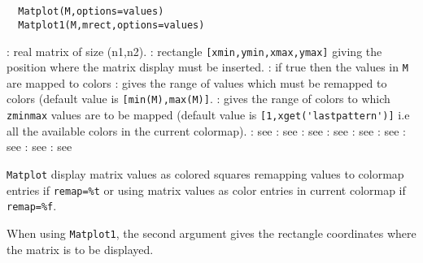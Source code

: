 
\begin{mandesc}
  \\
  \\
\end{mandesc}
\begin{calling_sequence}
\begin{verbatim}
  Matplot(M,options=values)
  Matplot1(M,mrect,options=values)
\end{verbatim}
\end{calling_sequence}

\begin{parameters}
  \begin{varlist}
    : real matrix of size (n1,n2).
    : rectangle \verb![xmin,ymin,xmax,ymax]! giving the position where the matrix display must be inserted.
    : if true then the values in \verb!M! are mapped to colors
    : gives the range of values which must be remapped to colors (default value is
    \verb![min(M),max(M)]!.
    : gives the range of colors to which \verb!zminmax! values are to be mapped
    (default value is \verb![1,xget('lastpattern')]! i.e all the available colors in the current
    colormap).
    : see 
    : see 
    :  see 
    :  see 
    :  see 
    : see 
    :  see 
    :  see 
    :  see 
  \end{varlist}
\end{parameters}

\begin{mandescription}
  \verb!Matplot! display matrix values as colored squares remapping values to colormap entries
  if \verb!remap=%t! or using matrix values as color entries in current colormap
  if \verb!remap=%f!.

  When using \verb!Matplot1!, the second argument gives the rectangle coordinates
  where the matrix is to be displayed.
\end{mandescription}

